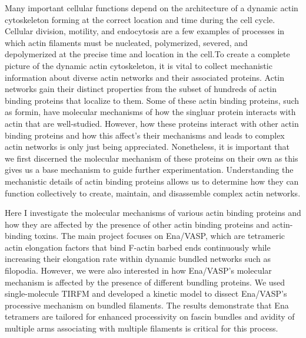 \abstract
Many important cellular functions depend on the architecture of a dynamic actin cytoskeleton forming at the correct location and time during the cell cycle. Cellular division, motility, and endocytosis are a few examples of processes in which actin filaments must be nucleated, polymerized, severed, and depolymerized at the precise time and location in the cell.To create a complete picture of the dynamic actin cytoskeleton, it is vital to collect mechanistic information about diverse actin networks and their associated proteins. Actin networks gain their distinct properties from the subset of hundreds of actin binding proteins that localize to them. Some of these actin binding proteins, such as formin, have molecular mechanisms of how the singluar protein interacts with actin that are well-studied. However, how these proteins interact with other actin binding proteins and how this affect's their mechanisms and leads to complex actin networks is only just being appreciated. Nonetheless, it is important that we first discerned the molecular mechanism of these proteins on their own as this gives us a base mechanism to guide further experimentation. Understanding the mechanistic details of actin binding proteins allows us to determine how they can function collectively to create, maintain, and disassemble complex actin networks. 

Here I investigate the molecular mechanisms of various actin binding proteins and how they are affected by the presence of other actin binding proteins and actin-binding toxins. The main project focuses on Ena/VASP, which are tetrameric actin elongation factors that bind F-actin barbed ends continuously while increasing their elongation rate within dynamic bundled networks such as filopodia. However, we were also interested in how Ena/VASP's molecular mechanism is affected by the presence of different bundling proteins. We used single-molecule TIRFM and developed a kinetic model to dissect Ena/VASP’s processive mechanism on bundled filaments. The results demonstrate that Ena tetramers are tailored for enhanced processivity on fascin bundles and avidity of multiple arms associating with multiple filaments is critical for this process. 

